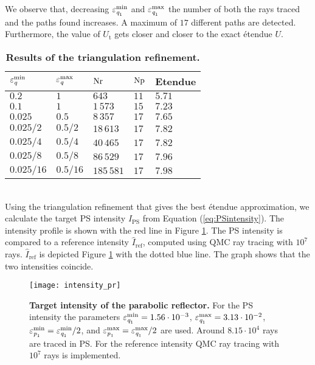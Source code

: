 We observe that, decreasing $\varepsilon_{\textit{q}_1}^{\textrm{min}}$ and $\varepsilon_{\textit{q}_1}^{\textrm{max}}$ the number of both the rays traced and the paths found increases. A maximum of $17$ different paths are detected. Furthermore, the value of $U_{\textrm{t}}$ gets closer and closer to the exact \'{e}tendue $U$.
\begin{table}[t] 
\centering
\caption{\bf Results of the triangulation refinement.}
\begin{tabular}{lllll}
 \hline   $\varepsilon_{\textit{q}}^{\textrm{min}} $  & $\varepsilon_{\textit{q}}^{\textrm{max}}$ & $\textrm{Nr}$ & $\textrm{Np}$ & Etendue \\
  \hline 
 $0.2$ & $1$   & $643$   &  $11$ & $5.71$\\
$0.1$ & $1$   & $1\,573$   &  $15$ & $7.23$\\
$0.025$  & $0.5$    & $8\,357$  & $17$ & $7.65$\\
 $0.025/2$  & $0.5/2$  & $18\,613$   & $17$ & $7.82$\\
$0.025/4$  & $0.5/4$  & $40\,465$   & $17$ & $7.82$\\
 $0.025/8$ & $0.5/8$  & $86\,529$    & $17$ & $7.96$\\
$0.025/16$ & $0.5/16$  & $185\,581$    & $17$ & $7.98$\\
 \hline
 \end{tabular}
 \label{tab:etendue_pr}
 \end{table}
\\ \indent Using the triangulation refinement that gives the best \'{e}tendue approximation, we calculate the target PS intensity $\hat{I}_{\textrm{PS}}$ from Equation (\ref{eq:PSintensity}).
The intensity profile is shown with the red line in Figure \ref{fig:intensity_pr}. The PS intensity is compared to a reference intensity $\hat{I}_{\textrm{ref}}$, computed using QMC ray tracing with $10^7$ rays. $\hat{I}_{\textrm{ref}}$ is depicted Figure \ref{fig:intensity_pr} with the dotted blue line. The graph shows that the two intensities coincide.
 \begin{figure}[h!]
  \center
  \texttt{[image: intensity\_pr]}
  \caption{\textbf{Target intensity of the parabolic reflector.} For the PS intensity the parameters $\varepsilon_{\textit{q}_1}^{\textrm{min}}=1.56\cdot 10^{-3}$, $\varepsilon_{\textit{q}_1}^{\textrm{max}}=3.13\cdot 10^{-2}$, $\varepsilon_{\textit{p}_1}^{\textrm{min}}=\varepsilon_{\textit{q}_1}^{\textrm{min}}/2$, and $\varepsilon_{\textit{p}_1}^{\textrm{max}}=\varepsilon_{\textit{q}_1}^{\textrm{max}}/2$ are used. Around $8.15 \cdot 10^{4}$ rays are traced in PS. For the reference intensity QMC ray tracing with $10^7$ rays is implemented.}
  \label{fig:intensity_pr}
\end{figure}
